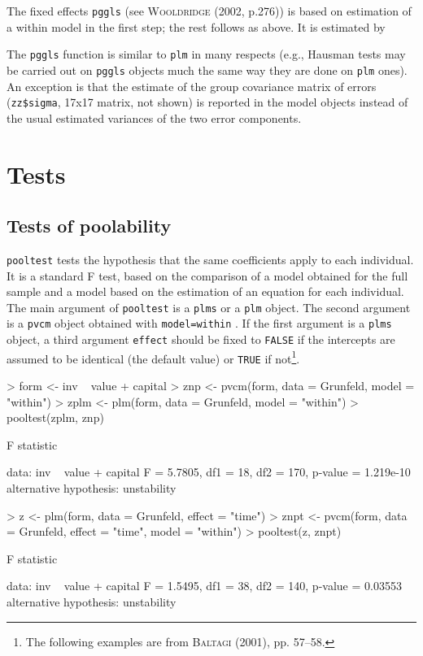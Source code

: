 \documentclass[a4paper]{article}
\begin{document}
The fixed effects \texttt{pggls} (see \textsc{Wooldridge} (2002, p.276)) is based on estimation of a within model in the first step; the rest follows as above. It is estimated by


The \texttt{pggls} function is similar to \texttt{plm} in many respects (e.g., Hausman tests may be carried out on \texttt{pggls} objects much the same way they are done on \texttt{plm} ones). An exception is that the estimate of the group covariance matrix of errors (\verb!zz$sigma!, 17x17 matrix, not shown) is reported in the model objects instead of the usual estimated variances of the two error components.

\section{Tests}


\subsection{Tests of poolability}

\texttt{pooltest} tests the hypothesis that the same coefficients
apply to each individual. It is a standard F test, based on the
comparison of a model obtained for the full sample and a model based
on the estimation of an equation for each individual. The main
argument of \texttt{pooltest} is a \texttt{plms} or a \texttt{plm} object. 
The second argument is a \texttt{pvcm} object obtained with \texttt{model=within} .
If the first argument is a \texttt{plms} object, 
a third argument  \texttt{effect} should be fixed to \texttt{FALSE} if
the intercepts are assumed to be identical (the default value) or \texttt{TRUE} if
not\footnote{The following examples are from 
  \textsc{Baltagi} (2001), pp. 57--58.}.

\begin{Schunk}
\begin{Sinput}
> form <- inv ~ value + capital
> znp <- pvcm(form, data = Grunfeld, model = "within")
> zplm <- plm(form, data = Grunfeld, model = "within")
> pooltest(zplm, znp)
\end{Sinput}
\begin{Soutput}
	F statistic

data:  inv ~ value + capital 
F = 5.7805, df1 = 18, df2 = 170, p-value = 1.219e-10
alternative hypothesis: unstability 
\end{Soutput}
\begin{Sinput}
> z <- plm(form, data = Grunfeld, effect = "time")
> znpt <- pvcm(form, data = Grunfeld, effect = "time", model = "within")
> pooltest(z, znpt)
\end{Sinput}
\begin{Soutput}
	F statistic

data:  inv ~ value + capital 
F = 1.5495, df1 = 38, df2 = 140, p-value = 0.03553
alternative hypothesis: unstability 
\end{Soutput}
\end{Schunk}
\end{document}
